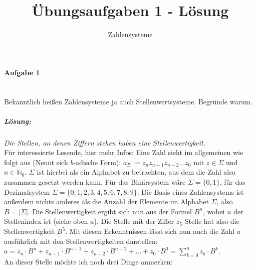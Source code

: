 \documentclass[12pt,a4paper,ngerman]{scrartcl}
\title{Übungsaufgaben 1 - Lösung}
\subtitle{Zahlensysteme}
\date{}
\begin{document}
	\maketitle
	
	\paragraph{Aufgabe 1}\mbox{}\\
	Bekanntlich heißen Zahlensysteme ja auch Stellenwertsysteme. Begründe warum.
	
	\subparagraph{Lösung:} \emph{Die Stellen, an denen Ziffern stehen haben eine Stellenwertigkeit.}\\ Für interessierte Lesende, hier mehr Infos: Eine Zahl sieht im allgemeinen wie folgt aus (Nennt sich $b$-adische Form): $a_B := z_nz_{n-1}z_{n-2} \dots z_0$ mit $z \in \Sigma$ und $n \in \mathbb{N}_0$. $\Sigma$ ist hierbei als ein Alphabet zu betrachten, aus dem die Zahl also zusammen gesetzt werden kann. Für das Binärsystem wäre $\Sigma = \{0,1\}$, für das Dezimalsystem $\Sigma = \{0,1,2,3,4,5,6,7,8,9\}$. Die Basis eines Zahlensystems ist außerdem nichts anderes als die Anzahl der Elemente im Alphabet $\Sigma$, also $B = |\Sigma|$. Die Stellenwertigkeit ergibt sich nun aus der Formel $B^n$, wobei $n$ der Stellenindex ist (siehe oben $a$). Die Stelle mit der Ziffer $z_5$ Stelle hat also die Stellenwertigkeit $B^5$. Mit diesen Erkenntnissen lässt sich nun auch die Zahl $a$ ausführlich mit den Stellenwertigkeiten darstellen: \\
	$a = z_n \cdot B^n + z_{n-1} \cdot B^{n-1} + z_{n-2} \cdot B^{n-2} + \dots + z_0 \cdot B^0
	= \sum_{k=0}^{n} z_k \cdot B^k$.\\
	An dieser Stelle möchte ich noch drei Dinge anmerken:
\end{document}
